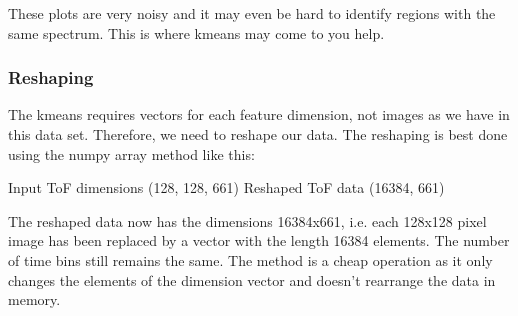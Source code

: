 \documentclass[letterpaper,10pt,english]{sphinxmanual}
\begin{document}
\noindent{}

These plots are very noisy and it may even be hard to identify regions with the same spectrum. This is where k\sphinxhyphen{}means may come to you help.


\subsubsection{Reshaping}
\label{\detokenize{ML4NeutronImageSegmentation:reshaping}}
The k\sphinxhyphen{}means requires vectors for each feature dimension, not images as we have in this data set. Therefore, we need to reshape our data. The reshaping is best done using the numpy array method  like this:

\begin{sphinxVerbatim}[commandchars=\\\{\}]
\PYG{p}{[}\PYG{p}{[}\PYG{p}{]}\PYG{p}{[}\PYG{p}{]}\PYG{p}{[}\PYG{p}{]}\PYG{p}{]}
\end{sphinxVerbatim}

\begin{sphinxVerbatim}[commandchars=\\\{\}]
Input ToF dimensions (128, 128, 661)
Reshaped ToF data (16384, 661)
\end{sphinxVerbatim}

The reshaped data  now has the dimensions 16384x661, i.e. each 128x128 pixel image has been replaced by a vector with the length 16384 elements. The number of time bins still remains the same. The method is a cheap operation as it only changes the elements of the dimension vector and doesn’t rearrange the data in memory.
\end{document}
